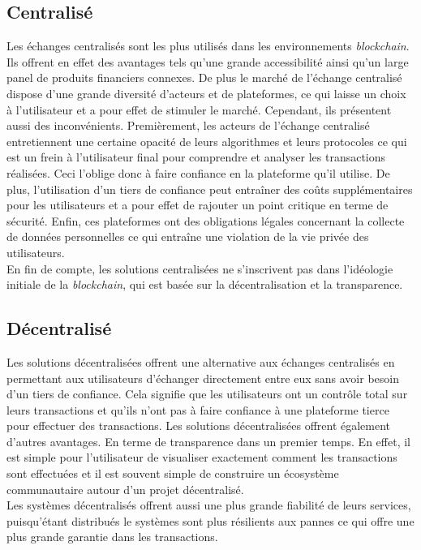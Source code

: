 \subsection{Centralisé} 
Les échanges centralisés sont les plus utilisés dans les environnements \textit{\gls{blockchain}}. Ils offrent en effet
des avantages tels qu'une grande accessibilité ainsi qu'un large panel de produits financiers connexes.
De plus le marché de l'échange centralisé dispose d'une grande diversité d'acteurs et de plateformes, ce
qui laisse un choix à l'utilisateur et a pour effet de stimuler le marché. 
Cependant, ils présentent aussi des inconvénients. Premièrement, les acteurs de l'échange centralisé entretiennent une certaine opacité 
de leurs algorithmes et leurs protocoles ce qui est un frein à l'utilisateur final pour comprendre et analyser 
les transactions réalisées. Ceci l'oblige donc à faire confiance en la plateforme qu'il utilise. 
De plus, l’utilisation d’un tiers de confiance peut entraîner des coûts supplémentaires pour 
les utilisateurs et a pour effet de rajouter un point critique en terme de sécurité. Enfin, ces plateformes ont 
des obligations légales concernant la collecte de données personnelles ce qui entraîne une violation de la vie 
privée des utilisateurs. \\
En fin de compte, les solutions centralisées ne s’inscrivent pas dans l’idéologie initiale de la \textit{blockchain}, qui est 
basée sur la décentralisation et la transparence.

\subsection{Décentralisé}
Les solutions décentralisées offrent une alternative aux échanges centralisés en permettant aux utilisateurs 
d’échanger directement entre eux sans avoir besoin d’un tiers de confiance. Cela signifie que les utilisateurs 
ont un contrôle total sur leurs transactions et qu’ils n’ont pas à faire confiance à une plateforme tierce pour 
effectuer des transactions. Les solutions décentralisées offrent également d'autres avantages. En terme de 
transparence dans un premier temps. En effet, il est simple pour l'utilisateur de visualiser exactement comment les 
transactions sont effectuées et il est souvent simple de construire un écosystème communautaire autour d'un projet
décentralisé. \\
Les systèmes décentralisés offrent aussi une plus grande fiabilité de leurs services, puisqu'étant distribués 
le systèmes sont plus résilients aux pannes ce qui offre une plus grande garantie dans les transactions.

